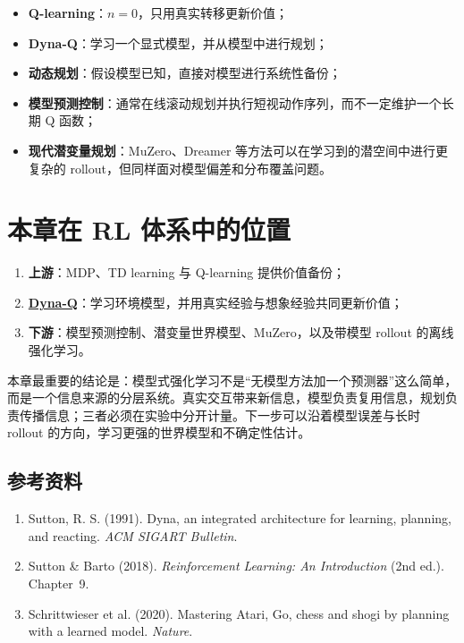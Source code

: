 \documentclass{article}
\begin{document}
\begin{itemize}
  \item \textbf{Q-learning}：$n=0$，只用真实转移更新价值；
  \item \textbf{Dyna-Q}：学习一个显式模型，并从模型中进行规划；
  \item \textbf{动态规划}：假设模型已知，直接对模型进行系统性备份；
  \item \textbf{模型预测控制}：通常在线滚动规划并执行短视动作序列，而不一定维护一个长期 Q 函数；
  \item \textbf{现代潜变量规划}：MuZero、Dreamer 等方法可以在学习到的潜空间中进行更复杂的 rollout，但同样面对模型偏差和分布覆盖问题。
\end{itemize}

\section*{本章在 RL 体系中的位置}

\begin{enumerate}
  \item \textbf{上游}：MDP、TD learning 与 Q-learning 提供价值备份；
  \item \underline{\textbf{Dyna-Q}}：学习环境模型，并用真实经验与想象经验共同更新价值；
  \item \textbf{下游}：模型预测控制、潜变量世界模型、MuZero，以及带模型 rollout 的离线强化学习。
\end{enumerate}

本章最重要的结论是：模型式强化学习不是“无模型方法加一个预测器”这么简单，而是一个信息来源的分层系统。真实交互带来新信息，模型负责复用信息，规划负责传播信息；三者必须在实验中分开计量。下一步可以沿着模型误差与长时 rollout 的方向，学习更强的世界模型和不确定性估计。

\subsection*{参考资料}

\begin{enumerate}
  \item Sutton, R. S. (1991). Dyna, an integrated architecture for learning, planning, and reacting. \textit{ACM SIGART Bulletin}.
  \item Sutton \& Barto (2018). \textit{Reinforcement Learning: An Introduction} (2nd ed.). Chapter~9.
  \item Schrittwieser et al. (2020). Mastering Atari, Go, chess and shogi by planning with a learned model. \textit{Nature}.
\end{enumerate}
\end{document}
